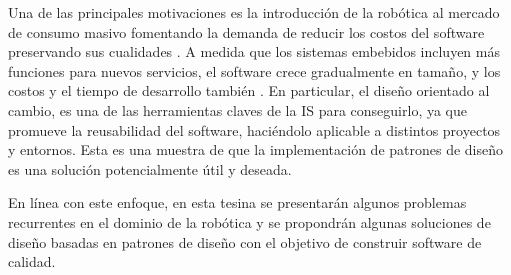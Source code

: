 Una de las principales motivaciones es la introducción de la robótica al mercado de consumo masivo fomentando la demanda de reducir los costos del software preservando sus cualidades \cite{Brugali2009}. A medida que los sistemas embebidos incluyen más funciones para nuevos servicios, el software crece gradualmente en tamaño, y los costos y el tiempo de desarrollo también \cite{model2}. En particular, el diseño orientado al cambio, es una de las herramientas claves de la IS para conseguirlo, ya que promueve la reusabilidad del software, haciéndolo aplicable a distintos proyectos y entornos. Esta es una muestra de que la implementación de patrones de diseño es una solución potencialmente útil y deseada.

En línea con este enfoque, en esta tesina se presentarán algunos problemas recurrentes en el dominio de la robótica y se propondrán algunas soluciones de diseño basadas en patrones de diseño con el objetivo de construir software de calidad.

